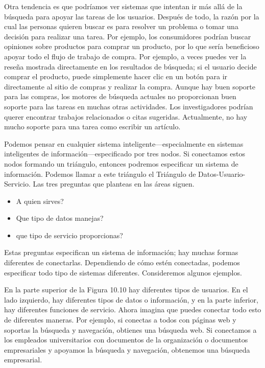 Otra tendencia es que podríamos ver sistemas que intentan ir más allá de la búsqueda para apoyar las tareas de los usuarios. Después de todo, la razón por la cual las personas quieren buscar es para resolver un problema o tomar una decisión para realizar una tarea. Por ejemplo, los consumidores podrían buscar opiniones sobre productos para comprar un producto, por lo que sería beneficioso apoyar todo el flujo de trabajo de compra. Por ejemplo, a veces puedes ver la reseña mostrada directamente en los resultados de búsqueda; si el usuario decide comprar el producto, puede simplemente hacer clic en un botón para ir directamente al sitio de compras y realizar la compra. Aunque hay buen soporte para las compras, los motores de búsqueda actuales no proporcionan buen soporte para las tareas en muchas otras actividades. Los investigadores podrían querer encontrar trabajos relacionados o citas sugeridas. Actualmente, no hay mucho soporte para una tarea como escribir un artículo.

Podemos pensar en cualquier sistema inteligente—especialmente en sistemas inteligentes de información—especificado por tres nodos. Si conectamos estos nodos formando un triángulo, entonces podremos especificar un sistema de información. Podemos llamar a este triángulo el Triángulo de Datos-Usuario-Servicio. Las tres preguntas que planteas en las áreas siguen.


\begin{itemize}
\item  A quien sirves?
\item Que tipo de datos manejas?
\item que tipo de servicio proporcionas?
\end{itemize}


Estas preguntas especifican un sistema de información; hay muchas formas diferentes de conectarlas. Dependiendo de cómo estén conectadas, podemos especificar todo tipo de sistemas diferentes. Consideremos algunos ejemplos.

En la parte superior de la Figura 10.10 hay diferentes tipos de usuarios. En el lado izquierdo, hay diferentes tipos de datos o información, y en la parte inferior, hay diferentes funciones de servicio. Ahora imagina que puedes conectar todo esto de diferentes maneras. Por ejemplo, si conectas a todos con páginas web y soportas la búsqueda y navegación, obtienes una búsqueda web. Si conectamos a los empleados universitarios con documentos de la organización o documentos empresariales y apoyamos la búsqueda y navegación, obtenemos una búsqueda empresarial.

